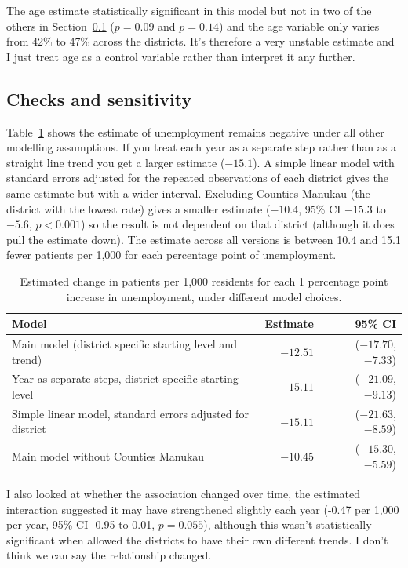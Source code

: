 \documentclass[11pt,a4paper]{article}
\begin{document}
The age estimate statistically significant in this model but not in two of the others in Section~\ref{sec:checks} ($p=0.09$ and $p=0.14$) and the age variable only varies from 42\% to 47\% across the districts. It's therefore a very unstable estimate and I just treat age as a control variable rather than interpret it any further.

\subsection{Checks and sensitivity} \label{sec:checks} 
Table~\ref{tab:sens} shows the estimate of unemployment remains negative under all other modelling assumptions. If you treat each year as a separate step rather than as a straight line trend you get a larger estimate ($-15.1$). A simple linear model with standard errors adjusted for the repeated observations of each district gives the same estimate but with a wider interval. Excluding Counties Manukau (the district with the lowest rate) gives a smaller estimate ($-10.4$, 95\% CI $-15.3$ to $-5.6$, $p<0.001$) so the result is not dependent on that district (although it does pull the estimate down). The estimate across all versions is between 10.4 and 15.1 fewer patients per 1,000 for each percentage point of unemployment.

\begin{table}[H]
\centering
\caption{Estimated change in patients per 1,000 residents for each 1 percentage point increase in unemployment, under different model choices.}
\label{tab:sens}
\begin{tabular}{p{8.4cm}rr}
\toprule
\textbf{Model} & \textbf{Estimate} & \textbf{95\% CI} \\
\midrule
Main model (district specific starting level and trend)           & $-12.51$ & ($-17.70$, $-7.33$) \\
Year as separate steps, district specific starting level          & $-15.11$ & ($-21.09$, $-9.13$) \\
Simple linear model, standard errors adjusted for district        & $-15.11$ & ($-21.63$, $-8.59$) \\
Main model without Counties Manukau                               & $-10.45$ & ($-15.30$, $-5.59$) \\
\bottomrule
\end{tabular}
\end{table}

I also looked at whether the association changed over time, the estimated interaction suggested it may have strengthened slightly each year (-0.47 per 1,000 per year, 95\% CI -0.95 to 0.01, $p=0.055$), although this wasn't statistically significant when allowed the districts to have their own different trends. I don't think we can say the relationship changed.
\end{document}

